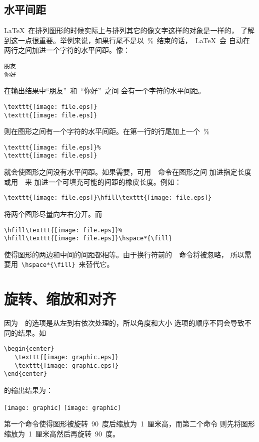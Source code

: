 \subsection{水平间距}\label{ssec:hspace}

\LaTeX{}~在排列图形的时候实际上与排列其它的像文字这样的对象是一样的，
了解到这一点很重要。举例来说，如果行尾不是以~\%~结束的话，~\LaTeX{}~会
自动在两行之间加进一个字符的水平间距。像：
\begin{Verbatim}[xleftmargin=1cm,formatcom=\CJKfamily{kai}\color{VerbatimColor}]
朋友
你好
\end{Verbatim}
在输出结果中``{朋友}''~和~``{你好}''~之间
会有一个字符的水平间距。

\begin{Verbatim}[xleftmargin=1cm]
\texttt{[image: file.eps]}
\texttt{[image: file.eps]}
\end{Verbatim}
则在图形之间有一个字符的水平间距。在第一行的行尾加上一个~\%~
\begin{Verbatim}[xleftmargin=1cm]
\texttt{[image: file.eps]}%
\texttt{[image: file.eps]}
\end{Verbatim}
就会使图形之间没有水平间距。如果需要，可用~~命令在图形之间
加进指定长度或用~~来
加进一个可填充可能的间距的橡皮长度。例如：
\begin{Verbatim}[xleftmargin=1cm]
\texttt{[image: file.eps]}\hfill\texttt{[image: file.eps]}
\end{Verbatim}
将两个图形尽量向左右分开。而
\begin{Verbatim}[xleftmargin=1cm]
\hfill\texttt{[image: file.eps]}%
\hfill\texttt{[image: file.eps]}\hspace*{\fill}
\end{Verbatim}
使得图形的两边和中间的间距都相等。由于换行符前的~~命令将被忽略，
所以需要用~\verb+\hspace*{\fill}+~来替代它。

\section{旋转、缩放和对齐}\label{sec:rotate-scale-align}

因为~~的选项是从左到右依次处理的，所以角度和大小
选项的顺序不同会导致不同的结果。如
\begin{Verbatim}[xleftmargin=1cm]
\begin{center}
   \texttt{[image: graphic.eps]}
   \texttt{[image: graphic.eps]}
\end{center}
\end{Verbatim}
的输出结果为：
\begin{center}
   \texttt{[image: graphic]}
   \texttt{[image: graphic]}
\end{center}
第一个命令使得图形被旋转~90~度后缩放为~1~厘米高，而第二个命令
则先将图形缩放为~1~厘米高然后再旋转~90~度。

